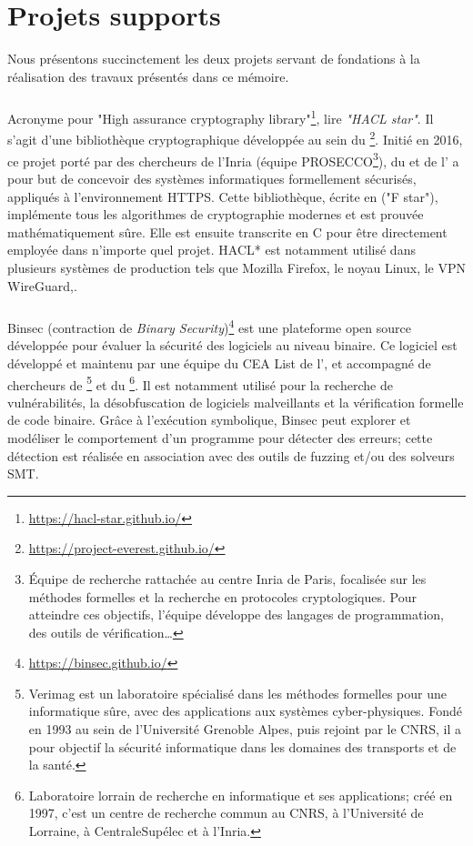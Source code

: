\chapter*{Projets supports}
\label{chap:supports}

Nous présentons succinctement les deux projets servant de fondations à la réalisation des travaux présentés dans ce mémoire.

\subsection*{}
Acronyme pour "High assurance cryptography library"\footnote{\url{https://hacl-star.github.io/}}, lire \textit{"HACL star"}. Il s'agit d'une bibliothèque cryptographique développée au sein du \textbf{}\footnote{\url{https://project-everest.github.io/}}. Initié en 2016, ce projet porté par des chercheurs de l'Inria (équipe PROSECCO\footnote{Équipe de recherche rattachée au centre Inria de Paris, focalisée sur les méthodes formelles et la recherche en protocoles cryptologiques. Pour atteindre ces objectifs, l'équipe développe des langages de programmation, des outils de vérification\dots}), du  et de l' a pour but de concevoir des systèmes informatiques formellement sécurisés, appliqués à l'environnement HTTPS. Cette bibliothèque, écrite en  ("F star"), implémente tous les algorithmes de cryptographie modernes et est prouvée mathématiquement sûre. Elle est ensuite transcrite en C pour être directement employée dans n'importe quel projet. HACL* est notamment utilisé dans plusieurs systèmes de production tels que Mozilla Firefox, le noyau Linux, le VPN WireGuard,\etc.


\subsection*{}
Binsec (contraction de \textit{Binary Security})\footnote{\url{https://binsec.github.io/}} est une plateforme open source développée pour évaluer la sécurité des logiciels au niveau binaire. Ce logiciel est développé et maintenu par une équipe du CEA List de l', et accompagné de chercheurs de \footnote{Verimag est un laboratoire spécialisé dans les méthodes formelles pour une informatique sûre, avec des applications aux systèmes cyber-physiques. Fondé en 1993 au sein de l'Université Grenoble Alpes, puis rejoint par le CNRS, il a pour objectif la sécurité informatique dans les domaines des transports et de la santé.} et du \footnote{Laboratoire lorrain de recherche en informatique et ses applications; créé en 1997, c'est un centre de recherche commun au CNRS, à l'Université de Lorraine, à CentraleSupélec et à l'Inria.}. Il est notamment utilisé pour la recherche de vulnérabilités, la désobfuscation de logiciels malveillants et la vérification formelle de code binaire. Grâce à l'exécution symbolique, Binsec peut explorer et modéliser le comportement d'un programme pour détecter des erreurs; cette détection est réalisée en association avec des outils de fuzzing et/ou des solveurs SMT.
